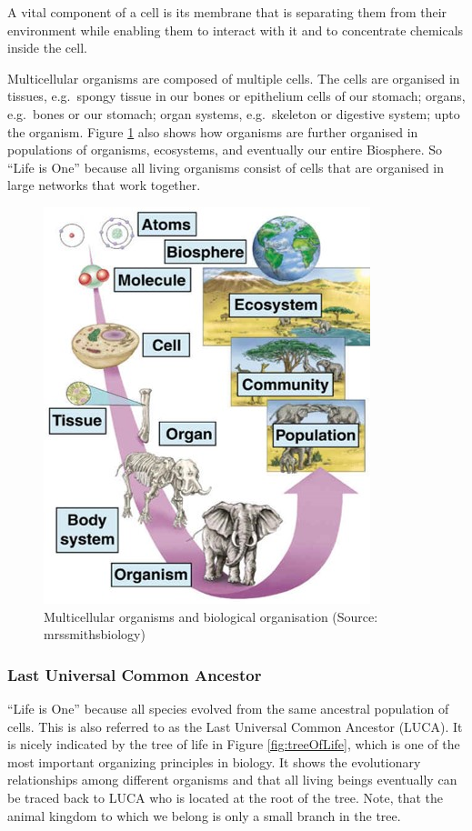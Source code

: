 \documentclass[
  11pt,
]{book}
\begin{document}
A vital component of a cell is its membrane that is separating them from their environment while enabling them to interact with it and to concentrate chemicals inside the cell.

Multicellular organisms are composed of multiple cells. The cells are organised in
tissues, e.g.~spongy tissue in our bones or epithelium cells of our stomach; organs, e.g.~bones or our stomach; organ systems, e.g.~skeleton or digestive system; upto the organism. Figure \ref{fig:multiCellular} also shows how organisms are further organised in populations of organisms, ecosystems, and eventually our entire Biosphere. So ``Life is One'' because all living organisms consist of cells that are organised in large networks that work together.

\begin{figure}

{\centering \includegraphics[width=0.3\linewidth]{./figs/organisationMulticellular} 

}

\caption{Multicellular organisms and biological organisation (Source: mrssmithsbiology)}\label{fig:multiCellular}
\end{figure}

\hypertarget{last-universal-common-ancestor}{%
\subsubsection{Last Universal Common Ancestor}\label{last-universal-common-ancestor}}

``Life is One'' because all species evolved from the same ancestral population of cells.
This is also referred to as the Last Universal Common Ancestor (LUCA). It is nicely indicated by the tree of life in Figure \ref{fig:treeOfLife}, which is one of the most important organizing principles in biology. It shows the evolutionary relationships among different organisms and that all living beings eventually can be traced back to LUCA who is located at the root of the tree. Note, that the animal kingdom to which we belong is only a small branch in the tree.
\end{document}
